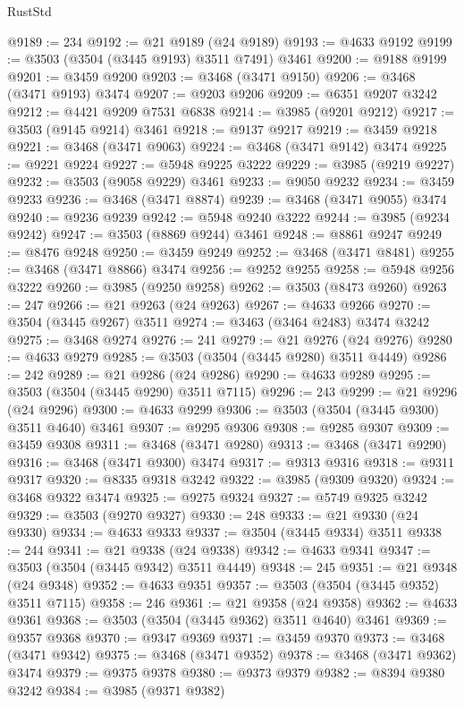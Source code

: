 \begin{lexlean}{RustStd}
\begin{coremodule}
@9189 := 234
@9192 := @21 @9189 (@24 @9189)
@9193 := @4633 @9192
@9199 := @3503 (@3504 (@3445 @9193) @3511 @7491) @3461
@9200 := @9188 @9199
@9201 := @3459 @9200
@9203 := @3468 (@3471 @9150)
@9206 := @3468 (@3471 @9193) @3474
@9207 := @9203 @9206
@9209 := @6351 @9207 @3242
@9212 := @4421 @9209 @7531 @6838
@9214 := @3985 (@9201 @9212)
@9217 := @3503 (@9145 @9214) @3461
@9218 := @9137 @9217
@9219 := @3459 @9218
@9221 := @3468 (@3471 @9063)
@9224 := @3468 (@3471 @9142) @3474
@9225 := @9221 @9224
@9227 := @5948 @9225 @3222
@9229 := @3985 (@9219 @9227)
@9232 := @3503 (@9058 @9229) @3461
@9233 := @9050 @9232
@9234 := @3459 @9233
@9236 := @3468 (@3471 @8874)
@9239 := @3468 (@3471 @9055) @3474
@9240 := @9236 @9239
@9242 := @5948 @9240 @3222
@9244 := @3985 (@9234 @9242)
@9247 := @3503 (@8869 @9244) @3461
@9248 := @8861 @9247
@9249 := @8476 @9248
@9250 := @3459 @9249
@9252 := @3468 (@3471 @8481)
@9255 := @3468 (@3471 @8866) @3474
@9256 := @9252 @9255
@9258 := @5948 @9256 @3222
@9260 := @3985 (@9250 @9258)
@9262 := @3503 (@8473 @9260)
@9263 := 247
@9266 := @21 @9263 (@24 @9263)
@9267 := @4633 @9266
@9270 := @3504 (@3445 @9267) @3511
@9274 := @3463 (@3464 @2483) @3474 @3242
@9275 := @3468 @9274
@9276 := 241
@9279 := @21 @9276 (@24 @9276)
@9280 := @4633 @9279
@9285 := @3503 (@3504 (@3445 @9280) @3511 @4449)
@9286 := 242
@9289 := @21 @9286 (@24 @9286)
@9290 := @4633 @9289
@9295 := @3503 (@3504 (@3445 @9290) @3511 @7115)
@9296 := 243
@9299 := @21 @9296 (@24 @9296)
@9300 := @4633 @9299
@9306 := @3503 (@3504 (@3445 @9300) @3511 @4640) @3461
@9307 := @9295 @9306
@9308 := @9285 @9307
@9309 := @3459 @9308
@9311 := @3468 (@3471 @9280)
@9313 := @3468 (@3471 @9290)
@9316 := @3468 (@3471 @9300) @3474
@9317 := @9313 @9316
@9318 := @9311 @9317
@9320 := @8335 @9318 @3242
@9322 := @3985 (@9309 @9320)
@9324 := @3468 @9322 @3474
@9325 := @9275 @9324
@9327 := @5749 @9325 @3242
@9329 := @3503 (@9270 @9327)
@9330 := 248
@9333 := @21 @9330 (@24 @9330)
@9334 := @4633 @9333
@9337 := @3504 (@3445 @9334) @3511
@9338 := 244
@9341 := @21 @9338 (@24 @9338)
@9342 := @4633 @9341
@9347 := @3503 (@3504 (@3445 @9342) @3511 @4449)
@9348 := 245
@9351 := @21 @9348 (@24 @9348)
@9352 := @4633 @9351
@9357 := @3503 (@3504 (@3445 @9352) @3511 @7115)
@9358 := 246
@9361 := @21 @9358 (@24 @9358)
@9362 := @4633 @9361
@9368 := @3503 (@3504 (@3445 @9362) @3511 @4640) @3461
@9369 := @9357 @9368
@9370 := @9347 @9369
@9371 := @3459 @9370
@9373 := @3468 (@3471 @9342)
@9375 := @3468 (@3471 @9352)
@9378 := @3468 (@3471 @9362) @3474
@9379 := @9375 @9378
@9380 := @9373 @9379
@9382 := @8394 @9380 @3242
@9384 := @3985 (@9371 @9382)

\end{coremodule}
\end{lexlean}
